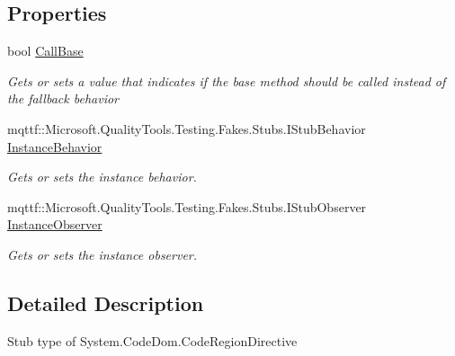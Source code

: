 \subsection*{Properties}
\begin{DoxyCompactItemize}
\item 
bool \hyperlink{class_system_1_1_code_dom_1_1_fakes_1_1_stub_code_region_directive_a03d85b73a8414946951a02d4dafb0a9f}{Call\-Base}
\begin{DoxyCompactList}\small\item\em Gets or sets a value that indicates if the base method should be called instead of the fallback behavior\end{DoxyCompactList}\item 
mqttf\-::\-Microsoft.\-Quality\-Tools.\-Testing.\-Fakes.\-Stubs.\-I\-Stub\-Behavior \hyperlink{class_system_1_1_code_dom_1_1_fakes_1_1_stub_code_region_directive_af43a4d9cc37a9dc85cdaf5c2a505ccdb}{Instance\-Behavior}
\begin{DoxyCompactList}\small\item\em Gets or sets the instance behavior.\end{DoxyCompactList}\item 
mqttf\-::\-Microsoft.\-Quality\-Tools.\-Testing.\-Fakes.\-Stubs.\-I\-Stub\-Observer \hyperlink{class_system_1_1_code_dom_1_1_fakes_1_1_stub_code_region_directive_a84c9360d4ad1750723fc6c2c299ecff2}{Instance\-Observer}
\begin{DoxyCompactList}\small\item\em Gets or sets the instance observer.\end{DoxyCompactList}\end{DoxyCompactItemize}


\subsection{Detailed Description}
Stub type of System.\-Code\-Dom.\-Code\-Region\-Directive



